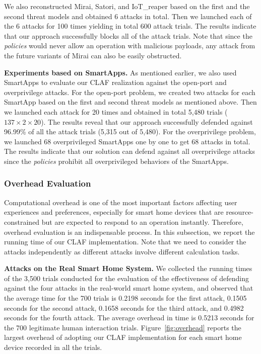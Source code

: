 \documentclass[letterpaper,12pt]{article}
\begin{document}
We also reconstructed Mirai, Satori, and IoT\_reaper based on the first and the second threat models and obtained 6 attacks in total. Then we launched each of the 6 attacks for 100 times yielding in total 600 attack trials. The results indicate that our approach successfully blocks all of the attack trials. Note that since the \textit{policies} would never allow an operation with malicious payloads, any attack from the future variants of Mirai can also be easily obstructed.

\textbf{Experiments based on SmartApps.} 
As mentioned earlier, we also used SmartApps to evaluate our CLAF realization against the open-port and overprivilege attacks. For the open-port problem, we created two attacks for each SmartApp based on the first and second threat models as mentioned above. Then we launched each attack for 20 times and obtained in total 5,480 trials ($137\times 2 \times 20$). The results reveal that our approach successfully defended against 96.99\% of all the attack trials (5,315 out of 5,480). For the overprivilege problem, we launched 68 overprivileged SmartApps one by one to get 68 attacks in total. The results indicate that our solution can defend against all overprivilege attacks since the \textit{policies} prohibit all overprivileged behaviors of the SmartApps. 

\subsubsection{Overhead Evaluation}
Computational overhead is one of the most important factors affecting user experiences and preferences, especially for smart home devices that are resource-constrained but are expected to respond to an operation instantly. Therefore, overhead evaluation is an indispensable process. In this subsection, we report the running time of our CLAF implementation. Note that we need to consider the attacks independently as different attacks involve different calculation tasks.

\textbf{Attacks on the Real Smart Home System.} 
We collected the running times of the 3,500 trials conducted for the evaluation of the effectiveness of defending against the four attacks in the real-world smart home system, and observed that the average time for the 700 trials is 0.2198 seconds for the first attack, 0.1505 seconds for the second attack, 0.1658 seconds for the third attack, and  0.4982 seconds for the fourth attack. The average overhead in time is 0.5213 seconds for the 700 legitimate human interaction trials. Figure~\ref{fig:overhead} reports the largest overhead of adopting our CLAF implementation for each smart home device recorded in all the trials. 
\end{document}
